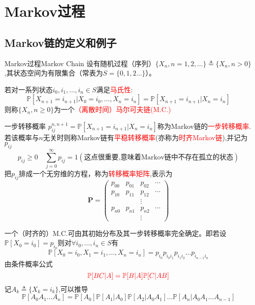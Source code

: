 \documentclass{elegantbook}
\newcommand\p{\mathbb{P}}
\begin{document}
\chapter{Markov过程}
\section{Markov链的定义和例子}
\begin{definition}{Markov过程}{Markov Chain}
    设有随机过程（序列）$\{X_n,n=1,2,\dots \}\triangleq\{X_n,n>0\}$,其状态空间为有限集合（常表为$S=\{0,1,2\dots\}$）。
    \par 若对一系列状态$i_0,i_1,\dots ,i_n\in S$满足\textcolor{red}{马氏性}:
    \[\p [X_{n+1}=i_{n+1}|X_0=i_0,\dots ,X_n=i_n]=\p [X_{n+1}=i_{n+1}|X_n=i_n]\]
    则称$\{X_n,n\geq 0\}$为一个\textcolor{red}{（离散时间）马尔可夫链(M.C.)}
\end{definition}

\begin{definition}{一步转移概率}{}
    $p_{ij}^{n,n+1}=\p [X_{n+1}=i_{n+1}|X_n=i_n]$称为Markov链的\textcolor{red}{一步转移概率}.若该概率与$n$无关时则称Markov链有\textcolor{red}{平稳转移概率}(亦称为\textcolor{red}{时齐Markov链}),并记为$p_{ij}$
    \[p_{ij}\geq 0\quad \sum_{j=0}^{\infty}p_{ij}=1(\text{这点很重要,意味着Markov链中不存在孤立的状态})\]
    把$p_{ij}$排成一个无穷维的方程，称为\textcolor{red}{转移概率矩阵},表示为
    \[\bm{P}=\begin{pmatrix}
      p_{00} & p_{01} & p_{02} & \cdots \\
      p_{10} & p_{11} & p_{12} & \cdots \\
       &  & \vdots &  \\
      p_{n0} & p_{n1} & p_{n2} & \cdots \\
       &  & \vdots & 
    \end{pmatrix}\]
\end{definition}

\begin{proposition}{}{}
    一个（时齐的）M.C.可由其初始分布及其一步转移概率完全确定。即若设$\p [X_0=i_0]=p_{i_0}$则对$\forall i_0,\dots ,i_n\in S$有
    \[\p [X_0=i_0,X_1=i_1,\dots ,X_n=i_n]=p_{i_0}p_{i_0i_1}p_{i_1i_2}\dots p_{i_{n-1}i_n}\]
    由条件概率公式\[\color{red}\p [BC|A]=\p [B|A]\p[C|AB]\]
    记$A_k\triangleq\{X_k=i_k\}$,可以推导
    \[\p[A_0A_1\dots A_n]=\p[A_0]\p[A_1|A_0]\p[A_2|A_0A_1]\dots \p[A_n|A_0A_1\dots A_{n-1}]\]
\end{proposition}
\end{document}
